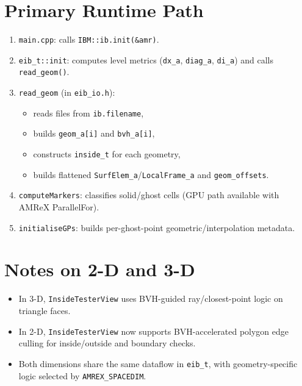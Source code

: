 \documentclass[11pt,a4paper]{article}
\begin{document}
\section{Primary Runtime Path}

\begin{enumerate}[nosep]
  \item \texttt{main.cpp}: calls \texttt{IBM::ib.init(\&amr)}.
  \item \texttt{eib\_t::init}: computes level metrics (\texttt{dx\_a}, \texttt{diag\_a}, \texttt{di\_a}) and calls \texttt{read\_geom()}.
  \item \texttt{read\_geom} (in \texttt{eib\_io.h}):
  \begin{itemize}[nosep]
    \item reads files from \texttt{ib.filename},
    \item builds \texttt{geom\_a[i]} and \texttt{bvh\_a[i]},
    \item constructs \texttt{inside\_t} for each geometry,
    \item builds flattened \texttt{SurfElem\_a}/\texttt{LocalFrame\_a} and \texttt{geom\_offsets}.
  \end{itemize}
  \item \texttt{computeMarkers}: classifies solid/ghost cells (GPU path available with AMReX ParallelFor).
  \item \texttt{initialiseGPs}: builds per-ghost-point geometric/interpolation metadata.
\end{enumerate}

\section{Notes on 2-D and 3-D}

\begin{itemize}[nosep]
  \item In 3-D, \texttt{InsideTesterView} uses BVH-guided ray/closest-point logic on triangle faces.
  \item In 2-D, \texttt{InsideTesterView} now supports BVH-accelerated polygon edge culling for inside/outside and boundary checks.
  \item Both dimensions share the same dataflow in \texttt{eib\_t}, with geometry-specific logic selected by \texttt{AMREX\_SPACEDIM}.
\end{itemize}
\end{document}
